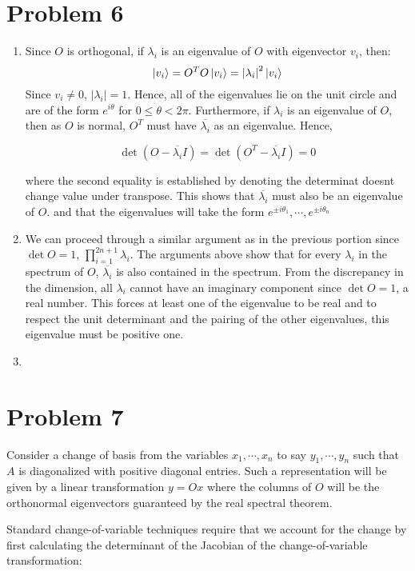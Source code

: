 \documentclass[12pt]{article}%
\begin{document}
\section{Problem 6}
\begin{enumerate}
  \item
  Since $O$ is orthogonal, if $\lambda_i$ is an eigenvalue of $O$ with eigenvector $v_i$,  then:
  \[\ket{v_i} = O^TO \ket{v_i} = \abs{\lambda_i}^2\ket{v_i} \]
  Since $v_i \neq 0$, $|\lambda_i| = 1$. Hence, all of the eigenvalues lie on the unit circle and are of the form $e^{i \theta}$ for $0 \leq \theta < 2\pi$. Furthermore, if $\lambda_i$ is an eigenvalue of $O$, then as $O$ is normal, $O^T$ must have $\overline{\lambda_i}$ as an eigenvalue. Hence,

  \[ \det(O - \overline{\lambda_i} I) = \det(O^T - \overline{\lambda_i} I) = 0 \]

  where the second equality is established by denoting the determinat doesnt change value under transpose. This shows that $\overline{\lambda_i}$ must also be an eigenvalue of $O$. and that the eigenvalues will take the form $e^{\pm i \theta_1}, \cdots,e^{\pm i \theta_n} $

  \item We can proceed through a similar argument as in the previous portion since $\det O = 1$, $\prod_{i=1}^{2n+1} \lambda_i$. The arguments above show that for every $\lambda_i$ in the spectrum of $O$, $\overline{\lambda_i}$ is also contained in the spectrum. From the discrepancy in the dimension, all $\lambda_i$ cannot have an imaginary component since $\det O = 1$, a real number. This forces at least one of the eigenvalue to be real and to respect the unit determinant and the pairing of the other eigenvalues, this eigenvalue must be positive one.

  \item 
\end{enumerate}


\section{Problem 7}
Consider a change of basis from the variables $x_1,\cdots, x_n$ to say $y_1, \cdots, y_n$ such that $A$ is diagonalized with positive diagonal entries. Such a representation will be given by a linear transformation $ y = Ox$ where the columns of $O$ will be the orthonormal eigenvectors guaranteed by the real spectral theorem.

Standard change-of-variable techniques require that we account for the change by first calculating the determinant of the Jacobian of the change-of-variable transformation:
\end{document}
